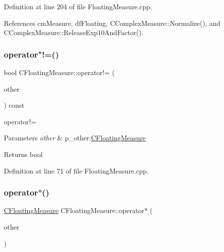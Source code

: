 Definition at line 204 of file Floating\+Measure.\+cpp.



References cm\+Measure, df\+Floating, C\+Complex\+Measure\+::\+Normalize(), and C\+Complex\+Measure\+::\+Release\+Exp10\+And\+Factor().

\mbox{\label{classCFloatingMeasure_afbedc9a56acac7c6738357ce2347aad3}} 
\subsubsection{\texorpdfstring{operator"!=()}{operator!=()}}
{\footnotesize\ttfamily bool C\+Floating\+Measure\+::operator!= (\begin{DoxyParamCaption}\item[{const \hyperlink{classCFloatingMeasure}{C\+Floating\+Measure} \&}]{other }\end{DoxyParamCaption}) const}



operator!= 


\begin{DoxyParams}{Parameters}
{\em other} & p\+\_\+other\+:\hyperlink{classCFloatingMeasure}{C\+Floating\+Measure} \\
\hline
\end{DoxyParams}
\begin{DoxyReturn}{Returns}
bool 
\end{DoxyReturn}


Definition at line 71 of file Floating\+Measure.\+cpp.

\mbox{\label{classCFloatingMeasure_a993623835ced24f74075861b2aab736e}} 
\subsubsection{\texorpdfstring{operator$\ast$()}{operator*()}\hspace{0.1cm}{\footnotesize\ttfamily [1/2]}}
{\footnotesize\ttfamily \hyperlink{classCFloatingMeasure}{C\+Floating\+Measure} C\+Floating\+Measure\+::operator$\ast$ (\begin{DoxyParamCaption}\item[{const \hyperlink{classCFloatingMeasure}{C\+Floating\+Measure} \&}]{other }\end{DoxyParamCaption})}




